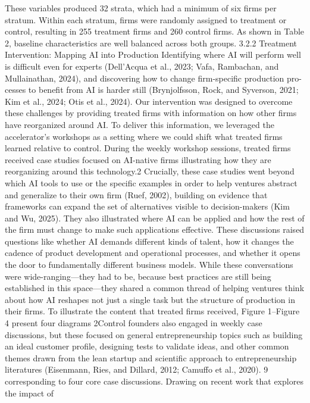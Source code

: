 These variables produced 32 strata, which had a minimum of six firms per stratum. Within
each stratum, firms were randomly assigned to treatment or control, resulting in 255 treatment
firms and 260 control firms. As shown in Table 2, baseline characteristics are well balanced across
both groups.
3.2.2
Treatment Intervention: Mapping AI into Production
Identifying where AI will perform well is difficult even for experts (Dell’Acqua et al., 2023; Vafa,
Rambachan, and Mullainathan, 2024), and discovering how to change firm-specific production pro-
cesses to benefit from AI is harder still (Brynjolfsson, Rock, and Syverson, 2021; Kim et al., 2024;
Otis et al., 2024).
Our intervention was designed to overcome these challenges by providing treated firms with
information on how other firms have reorganized around AI. To deliver this information, we leveraged
the accelerator’s workshops as a setting where we could shift what treated firms learned relative
to control. During the weekly workshop sessions, treated firms received case studies focused on
AI-native firms illustrating how they are reorganizing around this technology.2 Crucially, these case
studies went beyond which AI tools to use or the specific examples in order to help ventures abstract
and generalize to their own firm (Ruef, 2002), building on evidence that frameworks can expand
the set of alternatives visible to decision-makers (Kim and Wu, 2025). They also illustrated where
AI can be applied and how the rest of the firm must change to make such applications effective.
These discussions raised questions like whether AI demands different kinds of talent, how it changes
the cadence of product development and operational processes, and whether it opens the door to
fundamentally different business models. While these conversations were wide-ranging—they had to
be, because best practices are still being established in this space—they shared a common thread of
helping ventures think about how AI reshapes not just a single task but the structure of production
in their firms.
To illustrate the content that treated firms received, Figure 1–Figure 4 present four diagrams
2Control founders also engaged in weekly case discussions, but these focused on general entrepreneurship topics such
as building an ideal customer profile, designing tests to validate ideas, and other common themes drawn from the
lean startup and scientific approach to entrepreneurship literatures (Eisenmann, Ries, and Dillard, 2012; Camuffo
et al., 2020).
9
corresponding to four core case discussions. Drawing on recent work that explores the impact of
